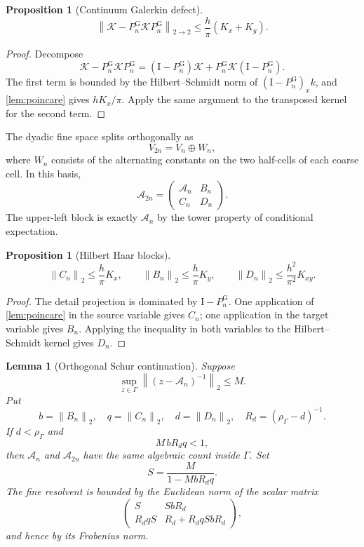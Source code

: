\documentclass[11pt]{article}
\newtheorem{proposition}[theorem]{Proposition}
\newtheorem{lemma}[theorem]{Lemma}
\theoremstyle{definition}
\theoremstyle{remark}
\newcommand{\Id}{\mathrm I}
\newcommand{\cA}{\mathcal A}
\newcommand{\cK}{\mathcal K}
\newcommand{\norm}[1]{\left\lVert #1\right\rVert}
\begin{document}
\begin{proposition}[Continuum Galerkin defect]
\label{prop:continuum-defect}
\[
 \norm{\cK-P_n^{\mathrm G}\cK P_n^{\mathrm G}}_{2\to2}
 \le\frac h\pi(K_x+K_y).
 \label{eq:continuum-defect}
\]
\end{proposition}

\begin{proof}
Decompose
\[
 \cK-P_n^{\mathrm G}\cK P_n^{\mathrm G}
 =(\Id-P_n^{\mathrm G})\cK
 +P_n^{\mathrm G}\cK(\Id-P_n^{\mathrm G}).
\]
The first term is bounded by the Hilbert--Schmidt norm of
$(\Id-P_n^{\mathrm G})_xk$, and \cref{lem:poincare} gives $hK_x/\pi$.
Apply the same argument to the transposed kernel for the second term.
\end{proof}

The dyadic fine space splits orthogonally as
\[
 V_{2n}=V_n\oplus W_n,
\]
where $W_n$ consists of the alternating constants on the two half-cells of
each coarse cell.  In this basis,
\begin{equation}
 \cA_{2n}=
 \begin{pmatrix}
 \cA_n&B_n\\
 C_n&D_n
 \end{pmatrix}.
 \label{eq:hilbert-blocks}
\end{equation}
The upper-left block is exactly $\cA_n$ by the tower property of conditional
expectation.

\begin{proposition}[Hilbert Haar blocks]
\label{prop:hilbert-blocks}
\[
 \norm{C_n}_2\le\frac h\pi K_x,\qquad
 \norm{B_n}_2\le\frac h\pi K_y,\qquad
 \norm{D_n}_2\le\frac{h^2}{\pi^2}K_{xy}.
 \label{eq:hilbert-block-bounds}
\]
\end{proposition}

\begin{proof}
The detail projection is dominated by $\Id-P_n^{\mathrm G}$.  One
application of \cref{lem:poincare} in the source variable gives $C_n$; one
application in the target variable gives $B_n$.  Applying the inequality in
both variables to the Hilbert--Schmidt kernel gives $D_n$.
\end{proof}

\begin{lemma}[Orthogonal Schur continuation]
\label{lem:schur}
Suppose
\[
 \sup_{z\in\Gamma}\norm{(z-\cA_n)^{-1}}_2\le M.
\]
Put
\[
 b=\norm{B_n}_2,\quad q=\norm{C_n}_2,\quad d=\norm{D_n}_2,\quad
 R_d=(\rho_\Gamma-d)^{-1}.
\]
If $d<\rho_\Gamma$ and
\begin{equation}
 M\,bR_dq<1,
 \label{eq:schur-gate}
\end{equation}
then $\cA_n$ and $\cA_{2n}$ have the same algebraic count inside $\Gamma$.
Set
\[
 S=\frac{M}{1-MbR_dq}.
\]
The fine resolvent is bounded by the Euclidean norm of the scalar matrix
\begin{equation}
 \begin{pmatrix}
 S&SbR_d\\
 R_dqS&R_d+R_dqSbR_d
 \end{pmatrix},
 \label{eq:block-majorant}
\end{equation}
and hence by its Frobenius norm.
\end{lemma}
\end{document}
